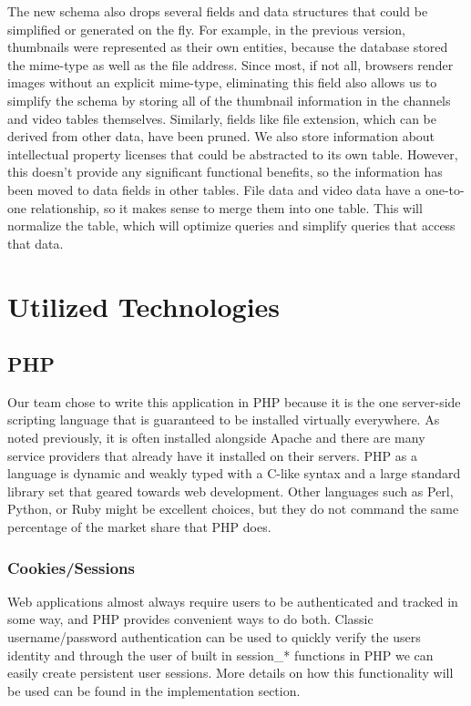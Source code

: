 \documentclass[a4paper,12pt]{report}
\begin{document}
The new schema also drops several fields and data structures that could be simplified or generated on the fly.
For example, in the previous version, thumbnails were represented as their own entities, because the database stored the mime-type as well as the file address.
Since most, if not all, browsers render images without an explicit mime-type, eliminating this field also allows us to simplify the schema by storing all of the thumbnail information in the channels and video tables themselves.
Similarly, fields like file extension, which can be derived from other data, have been pruned.
We also store information about intellectual property licenses that could be abstracted to its own table.
However, this doesn't provide any significant functional benefits, so the information has been moved to data fields in other tables. 
File data and video data have a one-to-one relationship, so it makes sense to merge them into one table.
This will normalize the table, which will optimize queries and simplify queries that access that data.


\chapter{Utilized Technologies}

\section{PHP}
Our team chose to write this application in PHP because it is the one server-side scripting language that is guaranteed to be installed virtually everywhere.
As noted previously, it is often installed alongside Apache and there are many service providers that already have it installed on their servers.
PHP as a language is dynamic and weakly typed with a C-like syntax and a large standard library set that geared towards web development.
Other languages such as Perl, Python, or Ruby might be excellent choices, but they do not command the same percentage of the market share that PHP does.


\subsection{Cookies/Sessions}
Web applications almost always require users to be authenticated and tracked in some way, and PHP provides convenient ways to do both.
Classic username/password authentication can be used to quickly verify the users identity and through the user of built in session\_* functions in PHP we can easily create persistent user sessions.
More details on how this functionality will be used can be found in the implementation section.
\end{document}
